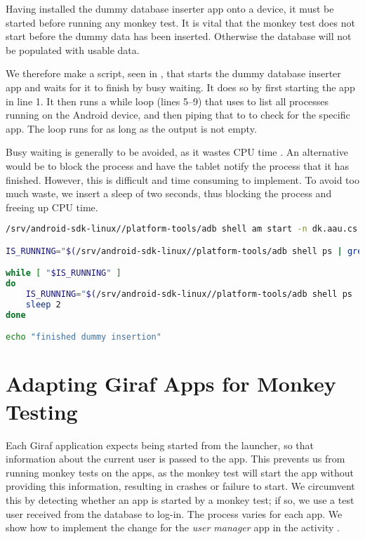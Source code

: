 Having installed the dummy database inserter app onto a device, it must be started before running any monkey test. It is vital that the monkey test does not start before the dummy data has been inserted. Otherwise the database will not be populated with usable data.

We therefore make a script, seen in , that starts the dummy database inserter app and waits for it to finish by busy waiting. It does so by first starting the app in line 1. It then runs a while loop (lines 5--9) that uses  to list all processes running on the Android device, and then piping that to  to check for the specific app. The loop runs for as long as the output is not empty.

Busy waiting is generally to be avoided, as it wastes CPU time \parencite[ch.2]{tanenbaum2007}. An alternative would be to block the process and have the tablet notify the process that it has finished. However, this is difficult and time consuming to implement. To avoid too much waste, we insert a sleep of two seconds, thus blocking the process and freeing up CPU time.

\begin{lstlisting}[language=bash,showstringspaces=false,caption=Start and wait for dummy database inserter,label=lst:start_wait_dummy_db_inserter]
/srv/android-sdk-linux//platform-tools/adb shell am start -n dk.aau.cs.giraf.dummydbinserter/dk.aau.cs.giraf.dummydbinserter.MainActivity

IS_RUNNING="$(/srv/android-sdk-linux//platform-tools/adb shell ps | grep dk.aau.cs.giraf.dummydbinserter)"

while [ "$IS_RUNNING" ]
do
    IS_RUNNING="$(/srv/android-sdk-linux//platform-tools/adb shell ps | grep dk.aau.cs.giraf.dummydbinserter)"
    sleep 2
done

echo "finished dummy insertion"
\end{lstlisting}

\section{Adapting Giraf Apps for Monkey Testing}\label{sec:adapting_apps_for_monkey_testing}
Each Giraf application expects being started from the launcher, so that information about the current user is passed to the app. This prevents us from running monkey tests on the apps, as the monkey test will start the app without providing this information, resulting in crashes or failure to start. We circumvent this by detecting whether an app is started by a monkey test; if so, we use a test user received from the database to log-in. The process varies for each app. We show how to implement the change for the \emph{user manager} app in the activity .

